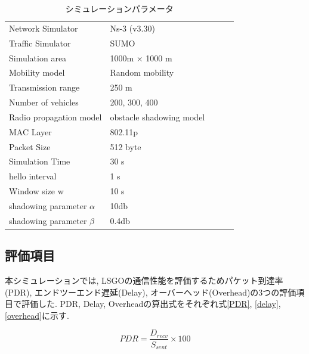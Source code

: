 \documentclass[10pt]{jreport}
\begin{document}
\begin{table}[!ht]
	\begin{center}
		\caption{シミュレーションパラメータ}
		\label{tab:parameter}
		\begin{tabular}{|l|l|lll}
			\cline{1-2}
			Network Simulator    & Ns-3 (v3.30) &  &  &  \\ \cline{1-2}
			Traffic Simulator    & SUMO &  &  &  \\ \cline{1-2}
			Simulation area    & 1000m × 1000 m   &  &  &  \\ \cline{1-2}
			Mobility model     & Random mobility &  &  &  \\ \cline{1-2}
			Transmission range & 250 m            &  &  &  \\ \cline{1-2}
			Number of vehicles & 200, 300, 400      &  &  &  \\ \cline{1-2}
			Radio propagation model    & obstacle shadowing model\cite{20}&  &  &  \\ \cline{1-2}
			MAC Layer     & 802.11p &  &  &  \\ \cline{1-2}
			Packet Size & 512 byte       &  &  &  \\ \cline{1-2}
			Simulation Time & 30 s      &  &  &  \\ \cline{1-2}
			hello interval & 1 s      &  &  &  \\ \cline{1-2}
			Window size w  & 10 s      &  &  &  \\ \cline{1-2}
			shadowing parameter $\alpha$  & 10db      &  &  &  \\ \cline{1-2}
			shadowing parameter $\beta$    & 0.4db &  &  \\ \cline{1-2}
		\end{tabular}
	\end{center}
\end{table}

\subsection{評価項目}
\label{evaluation_item}
本シミュレーションでは, LSGOの通信性能を評価するためパケット到達率(PDR), エンドツーエンド遅延(Delay), オーバーヘッド(Overhead)の3つの評価項目で評価した. PDR, Delay, Overheadの算出式をそれぞれ式\ref{PDR}, \ref{delay}, \ref{overhead}に示す.

\begin{equation}
	\label{PDR}
	PDR = \frac{D_{recv}}{  S_{sent}  } \times 100
\end{equation}
\end{document}
